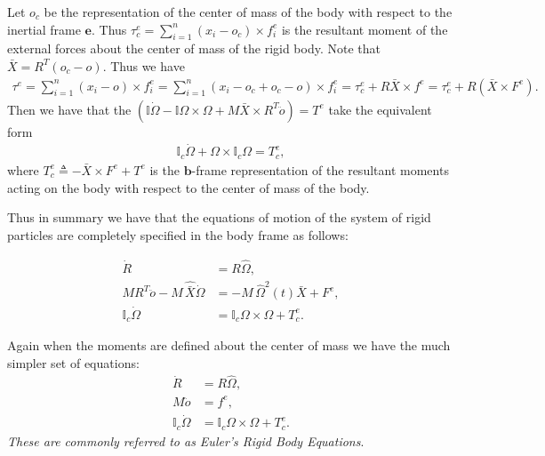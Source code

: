 \documentclass[graybox,envcountchap,sectrefs]{svmonoMuga}
\begin{document}
Let $o_c$ be the representation of the center of mass of the body with respect to the inertial frame $\mathbf{e}$. Thus $\tau_c^e=\sum_{i=1}^n(x_i-o_c)\times f_i^e$ is the resultant moment of the external forces about the center of mass of the rigid body. Note that $\bar{X}=R^T(o_c-o)$. Thus we have
\begin{align*}
\tau^e=\sum_{i=1}^n(x_i-o)\times f_i^e=\sum_{i=1}^n(x_i-o_c+o_c-o)\times f_i^e=\tau^e_c+R\bar{X}\times f^e=\tau^e_c+R(\bar{X}\times F^e).
\end{align*}
Then we have that the $\left(\mathbb{I}\dot{\Omega}-\mathbb{I}{\Omega}\times \Omega+M\bar{X}\times R^T\ddot{o}\right)=T^e$ take the equivalent form
\begin{align*}
\mathbb{I}_c\dot{\Omega}+\Omega \times \mathbb{I}_c{\Omega}=T^e_c,
\end{align*}
where $T^e_c\triangleq -\bar{X}\times F^e+T^e$ is the $\mathbf{b}$-frame representation of the resultant moments acting on the body with respect to the center of mass of the body.

Thus in summary we have that the equations of motion of the system of rigid particles are completely specified in the body frame as follows:
\begin{svgraybox}
\begin{align*}
\dot{R}&=R\widehat{\Omega},\\
MR^T\ddot{o}-M\,\widehat{\bar{X}}\dot{\Omega}&= -M\,\widehat{\Omega}^2(t) \bar{X} + F^e,\\
\mathbb{I}_c\dot{\Omega}&=\mathbb{I}_c\Omega \times {\Omega}+T^e_c.
\end{align*}
\end{svgraybox}

Again when the moments are defined about the center of mass we have the much simpler set of equations:
\begin{align}
\dot{R}&=R\widehat{\Omega},\\
M\ddot{o}&= f^e,\\
\mathbb{I}_c\dot{\Omega}&=\mathbb{I}_c\Omega \times {\Omega}+T^e_c.\label{eq:EulerEqns3D}
\end{align}
\textit{These are commonly referred to as Euler's Rigid Body Equations}.
\end{document}

